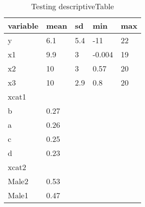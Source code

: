 \begin{table}[H]
\centering
\caption{Testing descriptiveTable} 
\label{tab:makedesc100}
\begin{tabular}{lllll}
  \hline
variable & mean & sd & min & max \\ 
  \hline
y & 6.1 & 5.4 & -11 &  22 \\ 
  x1 & 9.9 &   3 & -0.004 &  19 \\ 
  x2 &  10 &   3 & 0.57 &  20 \\ 
  x3 &  10 & 2.9 & 0.8 &  20 \\ 
  xcat1 &  &  &  &  \\ 
  b & 0.27 &  &  &  \\ 
  a & 0.26 &  &  &  \\ 
  c & 0.25 &  &  &  \\ 
  d & 0.23 &  &  &  \\ 
  xcat2 &  &  &  &  \\ 
  Male2 & 0.53 &  &  &  \\ 
  Male1 & 0.47 &  &  &  \\ 
   \hline
\end{tabular}
\end{table}

